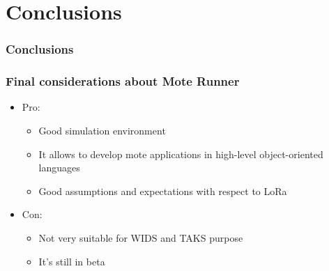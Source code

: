 \section{Conclusions} 
\begin{frame}[fragile]
  \frametitle{Conclusions}
\end{frame}

\begin{frame}[fragile]
  \frametitle{Final considerations about Mote Runner}
   \begin{itemize}
    \item Pro:
    \begin{itemize}
      \item Good simulation environment
      \item It allows to develop mote applications in high-level object-oriented languages
      \item Good assumptions and expectations with respect to LoRa
    \end{itemize}
    \item Con:
    \begin{itemize}
      \item Not very suitable for WIDS and TAKS purpose
      \item It's still in beta
    \end{itemize}
  \end{itemize}
\end{frame}
